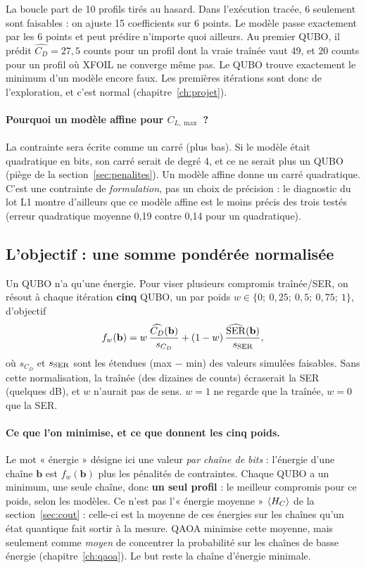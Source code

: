 \begin{piege}
La boucle part de 10 profils tirés au hasard. Dans l'exécution tracée, 6 seulement sont faisables : on ajuste 15 coefficients sur 6 points. Le modèle passe exactement par les 6 points et peut prédire n'importe quoi ailleurs. Au premier QUBO, il prédit $\widehat{C_D}=27{,}5$ counts pour un profil dont la vraie traînée vaut 49, et $20$ counts pour un profil où XFOIL ne converge même pas. Le QUBO trouve exactement le minimum d'un modèle encore faux. Les premières itérations sont donc de l'exploration, et c'est normal (chapitre~\ref{ch:projet}).
\end{piege}

\paragraph{Pourquoi un modèle affine pour $C_{L,\max}$ ?} La contrainte sera écrite comme un carré (plus bas). Si le modèle était quadratique en bits, son carré serait de degré 4, et ce ne serait plus un QUBO (piège de la section~\ref{sec:penalites}). Un modèle affine donne un carré quadratique. C'est une contrainte de \emph{formulation}, pas un choix de précision : le diagnostic du lot L1 montre d'ailleurs que ce modèle affine est le moins précis des trois testés (erreur quadratique moyenne 0,19 contre 0,14 pour un quadratique).

\subsection{L'objectif : une somme pondérée normalisée}
Un QUBO n'a qu'une énergie. Pour viser plusieurs compromis traînée/SER, on résout à chaque itération \textbf{cinq} QUBO, un par poids $w\in\{0;\ 0{,}25;\ 0{,}5;\ 0{,}75;\ 1\}$, d'objectif
\[ f_w(\mathbf b)=w\,\frac{\widehat{C_D}(\mathbf b)}{s_{C_D}}+(1-w)\,\frac{\widehat{\rm SER}(\mathbf b)}{s_{\rm SER}}, \]
où $s_{C_D}$ et $s_{\rm SER}$ sont les étendues (max $-$ min) des valeurs simulées faisables. Sans cette normalisation, la traînée (des dizaines de counts) écraserait la SER (quelques dB), et $w$ n'aurait pas de sens. $w=1$ ne regarde que la traînée, $w=0$ que la SER.

\paragraph{Ce que l'on minimise, et ce que donnent les cinq poids.} Le mot « énergie » désigne ici une valeur \emph{par chaîne de bits} : l'énergie d'une chaîne $\mathbf b$ est $f_w(\mathbf b)$ plus les pénalités de contraintes. Chaque QUBO a un minimum, une seule chaîne, donc \textbf{un seul profil} : le meilleur compromis pour ce poids, selon les modèles. Ce n'est pas l'« énergie moyenne » $\langle H_C\rangle$ de la section~\ref{sec:cout} : celle-ci est la moyenne de ces énergies sur les chaînes qu'un état quantique fait sortir à la mesure. QAOA minimise cette moyenne, mais seulement comme \emph{moyen} de concentrer la probabilité sur les chaînes de basse énergie (chapitre~\ref{ch:qaoa}). Le but reste la chaîne d'énergie minimale.


